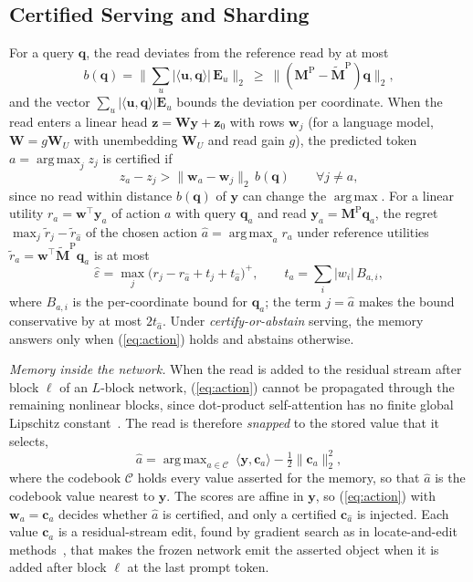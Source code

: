 \documentclass[journal]{IEEEtran}
\theoremstyle{remark}
\newcommand{\Mp}{\bm{M}^{\mathrm{P}}}
\newcommand{\Mpref}{\widetilde{\bm{M}}^{\mathrm{P}}}
\DeclareMathOperator*{\argmax}{arg\,max}
\begin{document}
\subsection{Certified Serving and Sharding}\label{sec:serving}
For a query $\bm{q}$, the read deviates from the reference read by at most
\begin{equation}\label{eq:qbound}
b(\bm{q})=\Big\|\textstyle\sum_{u}|\langle\bm{u},\bm{q}\rangle|\,\bm{E}_{u}\Big\|_2\ \ge\ \|(\Mp-\Mpref)\bm{q}\|_2 ,
\end{equation}
and the vector $\sum_u|\langle\bm{u},\bm{q}\rangle|\bm{E}_u$ bounds the deviation per coordinate. When the read enters a linear head $\bm{z}=\bm{W}\bm{y}+\bm{z}_0$ with rows $\bm{w}_j$ (for a language model, $\bm{W}=g\bm{W}_U$ with unembedding $\bm{W}_U$ and read gain $g$), the predicted token $a=\argmax_j z_j$ is certified if
\begin{equation}\label{eq:action}
z_a-z_j>\|\bm{w}_a-\bm{w}_j\|_2\,b(\bm{q})\qquad\forall j\ne a,
\end{equation}
since no read within distance $b(\bm{q})$ of $\bm{y}$ can change the $\argmax$. For a linear utility $r_a=\bm{w}^{\top}\bm{y}_a$ of action $a$ with query $\bm{q}_a$ and read $\bm{y}_a=\Mp\bm{q}_a$, the regret $\max_j\tilde{r}_j-\tilde{r}_{\hat a}$ of the chosen action $\hat{a}=\argmax_a r_a$ under reference utilities $\tilde{r}_a=\bm{w}^{\top}\Mpref\bm{q}_a$ is at most
\begin{equation}\label{eq:regret}
\hat{\varepsilon}=\max_j\big(r_j-r_{\hat a}+t_j+t_{\hat a}\big)^{+},\qquad t_a=\textstyle\sum_i|w_i|\,B_{a,i},
\end{equation}
where $B_{a,i}$ is the per-coordinate bound for $\bm{q}_a$; the term $j=\hat{a}$ makes the bound conservative by at most $2t_{\hat a}$. Under \emph{certify-or-abstain} serving, the memory answers only when (\ref{eq:action}) holds and abstains otherwise.

\emph{Memory inside the network.} When the read is added to the residual stream after block $\ell$ of an $L$-block network, (\ref{eq:action}) cannot be propagated through the remaining nonlinear blocks, since dot-product self-attention has no finite global Lipschitz constant~\cite{kim2021lipschitz}. The read is therefore \emph{snapped} to the stored value that it selects,
\begin{equation}\label{eq:snap}
\hat{a}=\argmax_{a\in\mathcal{C}}\ \langle\bm{y},\bm{c}_a\rangle-\tfrac{1}{2}\|\bm{c}_a\|_2^2,
\end{equation}
where the codebook $\mathcal{C}$ holds every value asserted for the memory, so that $\hat{a}$ is the codebook value nearest to $\bm{y}$. The scores are affine in $\bm{y}$, so (\ref{eq:action}) with $\bm{w}_a=\bm{c}_a$ decides whether $\hat{a}$ is certified, and only a certified $\bm{c}_{\hat a}$ is injected. Each value $\bm{c}_a$ is a residual-stream edit, found by gradient search as in locate-and-edit methods~\cite{meng2022rome}, that makes the frozen network emit the asserted object when it is added after block $\ell$ at the last prompt token.
\end{document}
